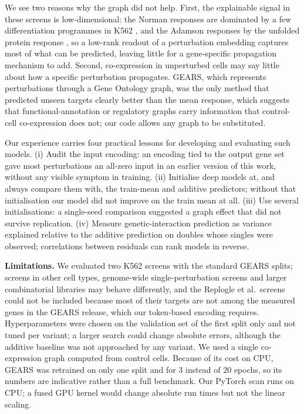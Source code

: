 \documentclass{bioinfo}
\begin{document}
We see two reasons why the graph did not help. First, the explainable signal in these screens is
low-dimensional: the Norman responses are dominated by a few differentiation programmes in K562
\citep{norman2019}, and the Adamson responses by the unfolded protein response \citep{adamson2016},
so a low-rank readout of a perturbation embedding captures most of what can be predicted, leaving
little for a gene-specific propagation mechanism to add. Second, co-expression in unperturbed cells
may say little about how a specific perturbation propagates. GEARS, which represents perturbations
through a Gene Ontology graph, was the only method that predicted unseen targets clearly better than
the mean response, which suggests that functional-annotation or regulatory graphs
\citep{roohani2024,wenkel2026} carry information that control-cell co-expression does not; our code
allows any graph to be substituted.

Our experience carries four practical lessons for developing and evaluating such models.
(i) Audit the input encoding: an encoding tied to the output gene set gave most perturbations an
all-zero input in an earlier version of this work, without any visible symptom in training.
(ii) Initialise deep models at, and always compare them with, the train-mean and additive
predictors; without that initialisation our model did not improve on the train mean at all.
(iii) Use several initialisations: a single-seed comparison suggested a graph effect that did not
survive replication. (iv) Measure genetic-interaction prediction as variance explained relative to
the additive prediction on doubles whose singles were observed; correlations between residuals can
rank models in reverse.

\textbf{Limitations.} We evaluated two K562 screens with the standard GEARS splits; screens in other
cell types, genome-wide single-perturbation screens and larger combinatorial libraries may behave
differently, and the Replogle et al.\ screens could not be included because most of their targets are
not among the measured genes in the GEARS release, which our token-based encoding requires.
Hyperparameters were chosen on the validation set of the first split only and not tuned per variant;
a larger search could change absolute errors, although the additive baseline was not approached by
any variant. We used a single co-expression graph computed from control cells. Because of its cost on CPU, GEARS was retrained on
only one split and for 3 instead of 20 epochs, so its numbers are indicative rather than a full
benchmark. Our PyTorch scan runs on CPU; a fused GPU kernel would change absolute run times but not
the linear scaling.
\end{document}
